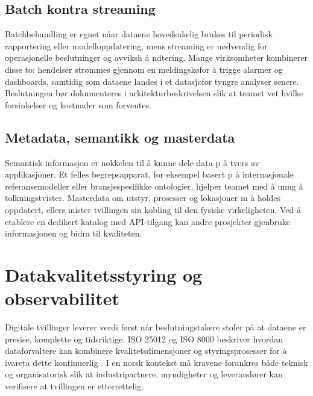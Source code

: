 \subsection{Batch kontra streaming}
Batchbehandling er egnet nåar dataene hovedsakelig brukes til periodisk rapportering eller modelloppdatering, mens streaming er nødvendig for operasjonelle beslutninger og avviksh å ndtering. Mange virksomheter kombinerer disse to: hendelser strømmes gjennom en meldingskøfor  å trigge alarmer og dashboards, samtidig som dataene landes i et datasjøfor tyngre analyser senere. Beslutningen bør dokumenteres i arkitekturbeskrivelsen slik at teamet vet hvilke forsinkelser og kostnader som forventes.

\subsection{Metadata, semantikk og masterdata}
Semantisk informasjon er nøkkelen til  å kunne dele data p å tvers av applikasjoner. Et felles begrepsapparat, for eksempel basert p å internasjonale referansemodeller eller bransjespesifikke ontologier, hjelper teamet med  å unng å tolkningstvister. Masterdata om utstyr, prosesser og lokasjoner m å holdes oppdatert, ellers mister tvillingen sin kobling til den fysiske virkeligheten. Ved  å etablere en dedikert katalog med API-tilgang kan andre prosjekter gjenbruke informasjonen og bidra til kvaliteten.

\section{Datakvalitetsstyring og observabilitet}
Digitale tvillinger leverer verdi først når beslutningstakere stoler på at dataene er presise, komplette og tidsriktige. ISO 25012 og ISO 8000 beskriver hvordan dataforvaltere kan kombinere kvalitetsdimensjoner og styringsprosesser for  å ivareta dette kontinuerlig \citep{iso25012-2014,iso8000-61-2016}. I en norsk kontekst må kravene forankres både teknisk og organisatorisk slik at industripartnere, myndigheter og leverandører kan verifisere at tvillingen er etterrettelig.

